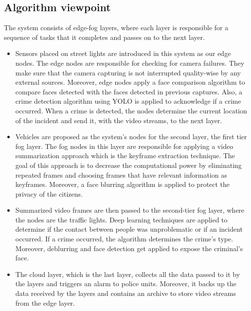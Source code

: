 \documentclass[12pt]{article}
\begin{document}
\subsection{Algorithm viewpoint}
The system consists of edge-fog layers, where each layer is responsible for a sequence of tasks that it completes and passes on to the next layer. 
\begin{itemize}
\item Sensors placed on street lights are introduced in this system as our edge nodes. The edge nodes are responsible for checking for camera failures. They make sure that the camera capturing is not interrupted quality-wise by any external sources. Moreover, edge nodes apply a face comparison algorithm to compare faces detected with the faces detected in previous captures. Also, a crime detection algorithm using YOLO is applied to acknowledge if a crime occurred. When a crime is detected, the nodes determine the current location of the incident and send it, with the video streams, to the next layer. 

\item Vehicles are proposed as the system’s nodes for the second layer, the first tier fog layer. The fog nodes in this layer are responsible for applying a video summarization approach which is the keyframe extraction technique. The goal of this approach is to decrease the computational power by eliminating repeated frames and choosing frames that have relevant information as keyframes. Moreover, a face blurring algorithm is applied to protect the privacy of the citizens. 

\item Summarized video frames are then passed to the second-tier fog layer, where the nodes are the traffic lights. Deep learning techniques are applied to determine if the contact between people was unproblematic or if an incident occurred. If a crime occurred, the algorithm determines the crime’s type. Moreover, deblurring and face detection get applied to expose the criminal's face.

\item The cloud layer, which is the last layer, collects all the data passed to it by the layers and triggers an alarm to police units. Moreover, it backs up the data received by the layers and contains an archive to store video streams from the edge layer.



\end{itemize}
\end{document}
